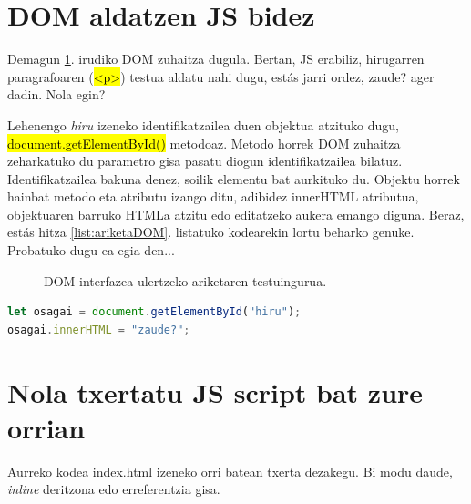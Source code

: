 \section{DOM aldatzen JS bidez}

Demagun \ref{fig:ariketaDOM}. irudiko DOM zuhaitza dugula. Bertan, JS erabiliz, hirugarren paragrafoaren (\hl{<p>}) testua aldatu nahi dugu, \textquotedbl{}estás\textquotedbl{} jarri ordez, \textquotedbl{}zaude?\textquotedbl{} ager dadin. Nola egin?

Lehenengo \textit{hiru} izeneko identifikatzailea duen objektua atzituko dugu,
 \hl{document.getElementById()} metodoaz. Metodo horrek DOM zuhaitza zeharkatuko du parametro gisa pasatu diogun identifikatzailea bilatuz. Identifikatzailea bakuna denez, soilik elementu bat aurkituko du. Objektu horrek hainbat metodo eta atributu izango ditu, adibidez \textquotedbl{}innerHTML\textquotedbl{} atributua, objektuaren barruko HTMLa atzitu edo editatzeko aukera emango diguna. Beraz, \textquotedbl{}estás\textquotedbl{} hitza \ref{list:ariketaDOM}. listatuko kodearekin lortu beharko genuke. Probatuko dugu ea egia den...

\begin{figure}[ht]
	\centering
{}
\caption{DOM interfazea ulertzeko ariketaren testuingurua.}
\label{fig:ariketaDOM}
\end{figure}


\begin{lstlisting}[language=JavaScript,numbers=none, label={list:ariketaDOM}, caption={getElementById erabil dezakegu DOM zuhaitzeko objektu bat atzitzeko.}]
let osagai = document.getElementById("hiru");
osagai.innerHTML = "zaude?";
\end{lstlisting}

\section{Nola txertatu JS script bat zure orrian}
Aurreko kodea index.html izeneko orri batean txerta dezakegu. Bi modu daude, \textit{inline} deritzona edo erreferentzia gisa. 

